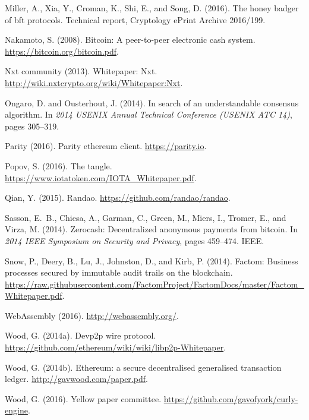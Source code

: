 \documentclass[t,usepdftitle=false]{beamer}
\begin{document}
\begin{thebibliography}{}
Miller, A., Xia, Y., Croman, K., Shi, E., and Song, D. (2016).
\newblock The honey badger of bft protocols.
\newblock Technical report, Cryptology ePrint Archive 2016/199.

Nakamoto, S. (2008).
\newblock Bitcoin: A peer-to-peer electronic cash system.
\newblock \url{https://bitcoin.org/bitcoin.pdf}.

{Nxt community} (2013).
\newblock Whitepaper: Nxt.
\newblock \url{http://wiki.nxtcrypto.org/wiki/Whitepaper:Nxt}.

Ongaro, D. and Ousterhout, J. (2014).
\newblock In search of an understandable consensus algorithm.
\newblock In {\em 2014 USENIX Annual Technical Conference (USENIX ATC 14)},
  pages 305--319.

{Parity} (2016).
\newblock Parity ethereum client.
\newblock \url{https://parity.io}.

Popov, S. (2016).
\newblock The tangle.
\newblock \url{https://www.iotatoken.com/IOTA_Whitepaper.pdf}.

Qian, Y. (2015).
\newblock Randao.
\newblock \url{https://github.com/randao/randao}.

Sasson, E.~B., Chiesa, A., Garman, C., Green, M., Miers, I., Tromer, E., and
  Virza, M. (2014).
\newblock Zerocash: Decentralized anonymous payments from bitcoin.
\newblock In {\em 2014 IEEE Symposium on Security and Privacy}, pages 459--474.
  IEEE.

Snow, P., Deery, B., Lu, J., Johnston, D., and Kirb, P. (2014).
\newblock Factom: Business processes secured by immutable audit trails on the
  blockchain.
\newblock
  \url{https://raw.githubusercontent.com/FactomProject/FactomDocs/master/Factom_Whitepaper.pdf}.

WebAssembly (2016).
\newblock \url{http://webassembly.org/}.

Wood, G. (2014a).
\newblock Devp2p wire protocol.
\newblock \url{https://github.com/ethereum/wiki/wiki/libp2p-Whitepaper}.

Wood, G. (2014b).
\newblock Ethereum: a secure decentralised generalised transaction ledger.
\newblock \url{http://gavwood.com/paper.pdf}.

Wood, G. (2016).
\newblock Yellow paper committee.
\newblock \url{https://github.com/gavofyork/curly-engine}.

\end{thebibliography}
\end{document}

